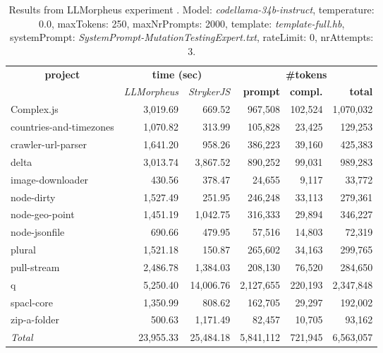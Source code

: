 
\begin{table*}[hbt!]
\centering
{\scriptsize
\begin{tabular}{l||r|r|r|r|r}
\multicolumn{1}{c|}{\bf project} & \multicolumn{2}{|c|}{\bf time (sec)} & \multicolumn{3}{|c|}{\bf \#tokens} \\
               & {\it LLMorpheus} & {\it StrykerJS} & {\bf prompt} & {\bf compl.} & {\bf total} \\
\hline
  Complex.js & 3,019.69 & 669.52 & 967,508 & 102,524 & 1,070,032 \\ 
countries-and-timezones & 1,070.82 & 313.99 & 105,828 & 23,425 & 129,253 \\ 
crawler-url-parser & 1,641.20 & 958.26 & 386,223 & 39,160 & 425,383 \\ 
delta & 3,013.74 & 3,867.52 & 890,252 & 99,031 & 989,283 \\ 
image-downloader & 430.56 & 378.47 & 24,655 & 9,117 & 33,772 \\ 
node-dirty & 1,527.49 & 251.95 & 246,248 & 33,113 & 279,361 \\ 
node-geo-point & 1,451.19 & 1,042.75 & 316,333 & 29,894 & 346,227 \\ 
node-jsonfile & 690.66 & 479.95 & 57,516 & 14,803 & 72,319 \\ 
plural & 1,521.18 & 150.87 & 265,602 & 34,163 & 299,765 \\ 
pull-stream & 2,486.78 & 1,384.03 & 208,130 & 76,520 & 284,650 \\ 
q & 5,250.40 & 14,006.76 & 2,127,655 & 220,193 & 2,347,848 \\ 
spacl-core & 1,350.99 & 808.62 & 162,705 & 29,297 & 192,002 \\ 
zip-a-folder & 500.63 & 1,171.49 & 82,457 & 10,705 & 93,162 \\ 
\hline
  \textit{Total} & 23,955.33 & 25,484.18 & 5,841,112 & 721,945 & 6,563,057 \\
  \end{tabular}
  }
  \\[2mm]
  \caption{Results from LLMorpheus experiment .
    Model: \textit{codellama-34b-instruct}, 
    temperature: 0.0, 
    maxTokens: 250, 
    maxNrPrompts: 2000, 
    template: \textit{template-full.hb}, 
    systemPrompt: \textit{SystemPrompt-MutationTestingExpert.txt}, 
    rateLimit: 0, 
    nrAttempts: 3.  
  }
  \label{table:Cost:run317:codellama-34b-instruct:template-full.hb:0.0}
\end{table*}